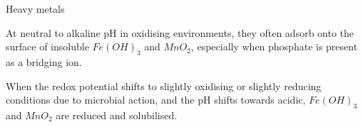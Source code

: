 \documentclass[a4paper,titlepage]{article}
\begin{document}
\begin{frame}{Heavy metals}
{\medskip At neutral to alkaline pH in oxidising environments, they often adsorb
onto the surface of insoluble \(Fe(OH)_3\) and \(MnO_2\), especially
when phosphate is present as a bridging ion.

\medskip When the redox potential shifts to slightly oxidising or slightly
reducing conditions due to microbial action, and the pH shifts towards
acidic, \(Fe(OH)_3\) and \(MnO_2\) are reduced and solubilised.
}
\end{frame}
\end{document}
